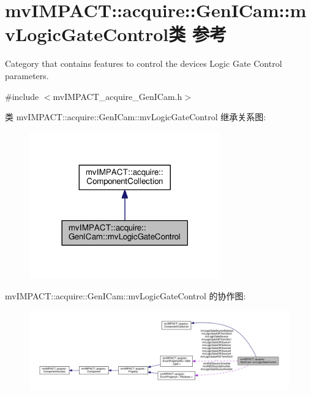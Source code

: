 \hypertarget{classmv_i_m_p_a_c_t_1_1acquire_1_1_gen_i_cam_1_1mv_logic_gate_control}{\section{mv\+I\+M\+P\+A\+C\+T\+:\+:acquire\+:\+:Gen\+I\+Cam\+:\+:mv\+Logic\+Gate\+Control类 参考}
\label{classmv_i_m_p_a_c_t_1_1acquire_1_1_gen_i_cam_1_1mv_logic_gate_control}
}


Category that contains features to control the devices Logic Gate Control parameters.  




{\ttfamily \#include $<$mv\+I\+M\+P\+A\+C\+T\+\_\+acquire\+\_\+\+Gen\+I\+Cam.\+h$>$}



类 mv\+I\+M\+P\+A\+C\+T\+:\+:acquire\+:\+:Gen\+I\+Cam\+:\+:mv\+Logic\+Gate\+Control 继承关系图\+:
\nopagebreak
\begin{figure}[H]
\begin{center}
\leavevmode
\includegraphics[width=234pt]{classmv_i_m_p_a_c_t_1_1acquire_1_1_gen_i_cam_1_1mv_logic_gate_control__inherit__graph}
\end{center}
\end{figure}


mv\+I\+M\+P\+A\+C\+T\+:\+:acquire\+:\+:Gen\+I\+Cam\+:\+:mv\+Logic\+Gate\+Control 的协作图\+:
\nopagebreak
\begin{figure}[H]
\begin{center}
\leavevmode
\includegraphics[width=350pt]{classmv_i_m_p_a_c_t_1_1acquire_1_1_gen_i_cam_1_1mv_logic_gate_control__coll__graph}
\end{center}
\end{figure}
